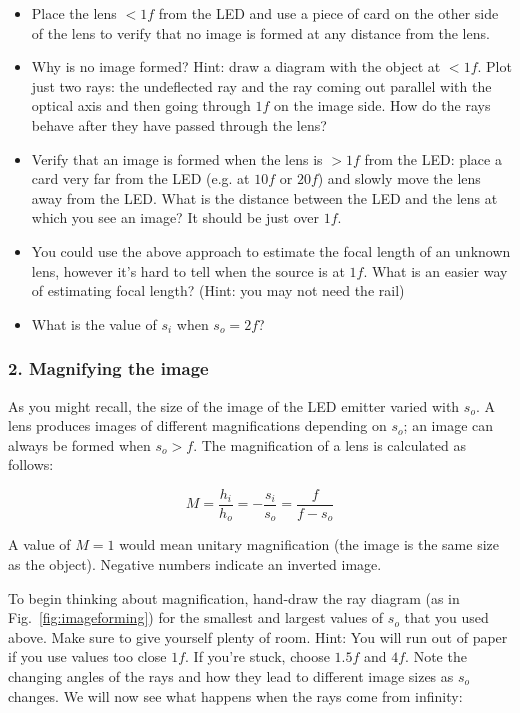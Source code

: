 \documentclass[a4paper]{report}
\begin{document}
\begin{itemize}
\item Place the lens $<1f$ from the LED and use a piece of card on the other side of the lens to verify that no image is formed at any distance from the lens.
\item Why is no image formed? 
Hint: draw a diagram with the object at $<1f$. Plot just two rays: the undeflected ray and the ray coming out parallel with the optical axis and then going through $1f$ on the image side. 
How do the rays behave after they have passed through the lens?

\item Verify that an image is formed when the lens is $>1f$ from the LED: place a card very far from the LED (e.g. at $10f$ or $20f$) and slowly move the lens away from the LED. 
What is the distance between the LED and the lens at which you see an image? 
It should be just over $1f$.

\item You could use the above approach to estimate the focal length of an unknown lens, however it's hard to tell when the source is at $1f$. 
What is an easier way of estimating focal length? (Hint: you may not need the rail)

\item What is the value of $s_i$ when $s_o=2f$?
\end{itemize}



\clearpage

\subsubsection{2. Magnifying the image}
As you might recall, the size of the image of the LED emitter varied with $s_o$.
A lens produces images of different magnifications depending on $s_o$; an image can always be formed when $s_o>f$. 
The magnification of a lens is calculated as follows:

\begin{equation}
M = \frac{h_i}{h_o} = -\frac{s_i}{s_o} = \frac{f}{f-s_o}
\label{eq:mag}
\end{equation}

A value of $M=1$ would mean unitary magnification (the image is the same size as the object). 
Negative numbers indicate an inverted image.

To begin thinking about magnification, hand-draw the ray diagram (as in Fig.~\ref{fig:imageforming}) for the smallest and largest values of $s_o$ that you used above. 
Make sure to give yourself plenty of room. 
Hint: You will run out of paper if you use values too close $1f$.
If you're stuck, choose $1.5f$ and $4f$.
Note the changing angles of the rays and how they lead to different image sizes as $s_o$ changes. 
We will now see what happens when the rays come from infinity:
\end{document}
